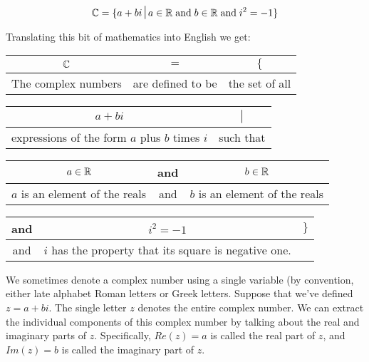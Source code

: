 \[ \Complexes = \{ a + bi \suchthat a \in \Reals \; \mbox{and} \; b \in
\Reals \; \mbox{and} \; i^2 = -1 \} \]

Translating this bit of mathematics into English we get: 

\vspace{.2in}

\begin{tabular}{c|c|c}
\rule[-10pt]{0pt}{22pt} ${\mathbb C}$ & $=$ & $\{$  \\ \hline
\rule[-6pt]{0pt}{22pt} The complex numbers & are defined to be & the set of all\\
\end{tabular}

\vspace{.2in}

\begin{tabular}{c|c}
\rule[-10pt]{0pt}{22pt} $a+bi$ & $\suchthat$ \\ \hline
\rule[-6pt]{0pt}{22pt} expressions of the form $a$ plus $b$ times $i$ & such that \\
\end{tabular}

\vspace{.2in}

\begin{tabular}{c|c|c}
\rule[-10pt]{0pt}{22pt} $a \in {\mathbb R}$ & and & $b \in {\mathbb R}$ \\ \hline
\rule[-6pt]{0pt}{22pt} $a$ is an element of the reals & and & $b$ is an
element of the reals \\
\end{tabular}

\vspace{.2in}

\begin{tabular}{c|c|c}
\rule[-10pt]{0pt}{22pt} and & $i^2 = -1$ & $\}$ \\ \hline
\rule[-6pt]{0pt}{22pt} and & $i$ has the property that its
square is negative one. &  \\
\end{tabular}

\vspace{.2in}

We sometimes denote a complex number using a single variable (by
convention, either late alphabet Roman letters or Greek letters.
Suppose that we've defined $z = a + bi$.  The single letter $z$
denotes the entire complex number.  We can extract the individual
components of this complex number by talking about the 
real and
imaginary parts of $z$.  
Specifically, $Re(z) = a$ is called the
real part of $z$, and $Im(z) = b$ is called the imaginary part of
$z$.


